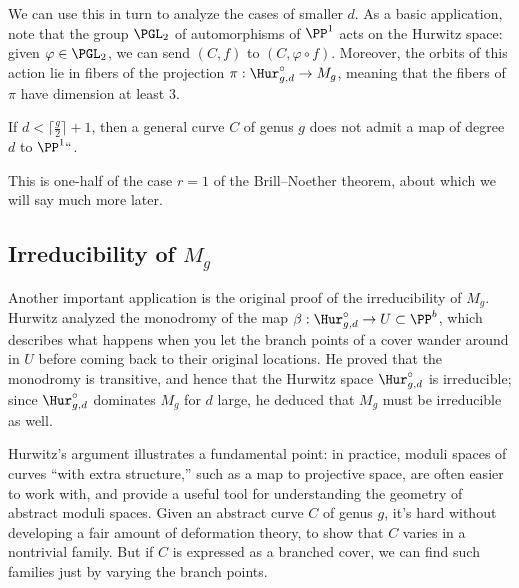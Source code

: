 We can use this in turn to analyze the cases of smaller $d$. As a
basic application, note that the group $\PGL_2$ of automorphisms of
$\PP^1$ acts on the Hurwitz space: given $\varphi \in \PGL_2$, we can
send $(C,f)$ to $(C, \varphi \circ f)$. Moreover, the orbits of this
action lie in fibers of the projection $\pi : \Hur^\circ_{g,d} \to M_g$, 
meaning that the fibers of $\pi$ have dimension at least 3.

\begin{corollary}\label{branched cover BN}
If $d < \bigl\lceil \frac{g}{2} \bigr\rceil + 1$, then a general curve 
$C$ of genus $g$ does not admit a map of degree $d$ to $\PP^1` `$.
\unif
\end{corollary}

This is one-half of the case $r=1$ of the 
Brill--Noether theorem,
%
about which we will say much more later.

\subsection*{Irreducibility of $M_g$}

Another important application is the original proof of the
%
%
irreducibility of $M_g$. Hurwitz \citeyear{Hurwitz} analyzed the
%
%
monodromy of the map $\beta: \Hur^\circ_{g,d} \to U \subset\PP^b$,
which describes what happens
when you let the branch
points of a cover wander around in $U$ before coming back to their
original locations. He proved that the monodromy is transitive, and
hence that the Hurwitz space $\Hur^\circ_{g,d}$ is irreducible; since
$\Hur^\circ_{g,d}$ dominates $M_g$ for $d$ large, he deduced that $M_g$
must be irreducible as well.

Hurwitz's argument illustrates a fundamental point: in practice,
moduli spaces of curves ``with extra structure,'' such as a map to
projective space, are often easier to work with, and provide a useful
tool for understanding the geometry of abstract moduli spaces. Given an abstract curve $C$ of genus $g$, it's
hard without developing a fair amount of deformation
theory, to show that $C$ varies in a nontrivial family. But if
$C$ is expressed as a branched cover, we can find such families just
by varying the branch points.

